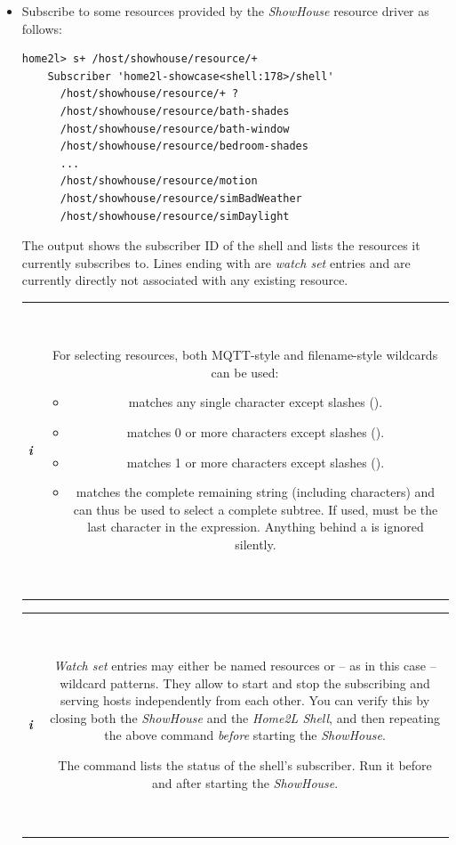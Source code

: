 \documentclass[12pt,english,parskip=half,headheight=19pt]{scrreprt}
\newcommand{\lst}[1]{\colorbox{lstbackground}{\footnotesize\code{#1}}}
\newcommand{\infobox}[1]{
  \par
  \medskip
  \hfill
  \setlength\arrayrulewidth{1pt}
  \begin{tabular}[t]{c|c|}
    \parbox{1.8em}{\hfill\textit{\Huge\textbf{i}\,}}
    &
    \,\parbox{0.89\linewidth}{\setlength{\parskip}{0.5em} \small #1}\,
  \end{tabular}
  \medskip
  \par
}
\begin{document}
\begin{itemize}[$\blacktriangleright$]

\item
  Subscribe to some resources provided by the \textit{ShowHouse} resource driver as follows:
  \begin{lstlisting}[language=home2l]
    home2l> s+ /host/showhouse/resource/+
    Subscriber 'home2l-showcase<shell:178>/shell'
      /host/showhouse/resource/+ ?
      /host/showhouse/resource/bath-shades
      /host/showhouse/resource/bath-window
      /host/showhouse/resource/bedroom-shades
      ...
      /host/showhouse/resource/motion
      /host/showhouse/resource/simBadWeather
      /host/showhouse/resource/simDaylight
  \end{lstlisting}
  The output shows the subscriber ID of the shell and lists the resources it
  currently subscribes to. Lines ending with \lst{?} are \textit{watch set}
  entries and are currently directly not associated with any existing resource.

  \infobox{
    For selecting resources, both MQTT-style and filename-style wildcards can be used:
    \begin{itemize}
      \item[\lst{?}] matches any single character except slashes (\lst{/}).
      \item[\lst{*}] matches 0 or more characters except slashes (\lst{/}).
      \item[\lst{+}] matches 1 or more characters except slashes (\lst{/}).
      \item[\lst{#}] matches the complete remaining string (including \lst{/} characters) and can
          thus be used to select a complete subtree. If used, \lst{#} must be the last
          character in the expression. Anything behind a \lst{#} is ignored silently.
    \end{itemize}
  }

  \infobox{
    \textit{Watch set} entries may either be named resources or -- as in this case -- wildcard
    patterns. They allow to start and stop the subscribing and serving hosts independently
    from each other. You can verify this by closing both the \textit{ShowHouse} and the \textit{Home2L Shell},
    and then repeating the above command \textit{before} starting the \textit{ShowHouse}.

    The command \lst{s} lists the status of the shell's subscriber. Run it before and after starting
    the \textit{ShowHouse}.
  }


\end{itemize}
\end{document}
